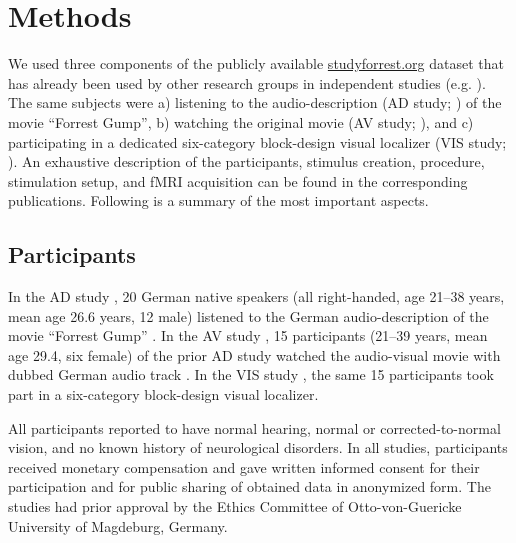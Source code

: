 \documentclass[english]{article}
\begin{document}
\section{Methods}



We used three components of the publicly available
\href{http://www.studyforrest.org}{studyforrest.org} dataset that has already
been used by other research groups in independent studies (e.g.
\citep{ben2018hippocampal, jiahui2019predicting, hu2017decoding,
lettieri2019emotionotopy, nguyen2016integration}).
The same subjects were
a) listening to the audio-description (AD study; \citep{hanke2014audiomovie}) of
the movie ``Forrest Gump'',
b) watching the original movie (AV study; \citep{hanke2016simultaneous}), and
c) participating in a dedicated six-category block-design visual localizer (VIS
study; \citep{sengupta2016extension}).
An exhaustive description of the participants, stimulus creation, procedure,
stimulation setup, and fMRI acquisition can be found in the corresponding
publications. Following is a summary of the most important aspects.


\subsection{Participants}
In the AD study \citep{hanke2014audiomovie}, 20 German native speakers (all
right-handed, age 21–38 years, mean age 26.6 years, 12 male) listened to the
German audio-description \citep{ForrestGumpGermanAD} of the movie ``Forrest
Gump'' \citep{ForrestGumpMovie}.
In the AV study \citep{hanke2016simultaneous}, 15 participants (21–39 years,
mean age 29.4, six female) of the prior AD study watched the audio-visual movie
with dubbed German audio track \citep{ForrestGumpDVD}.
In the VIS study \citep{sengupta2016extension}, the same 15 participants took
part in a six-category block-design visual localizer.

All participants reported to have normal hearing, normal or corrected-to-normal
vision, and no known history of neurological disorders.
In all studies, participants received monetary compensation and gave written
informed consent for their participation and for public sharing of obtained data
in anonymized form. The studies had prior approval by the Ethics Committee of
Otto-von-Guericke University of Magdeburg, Germany.
\end{document}
